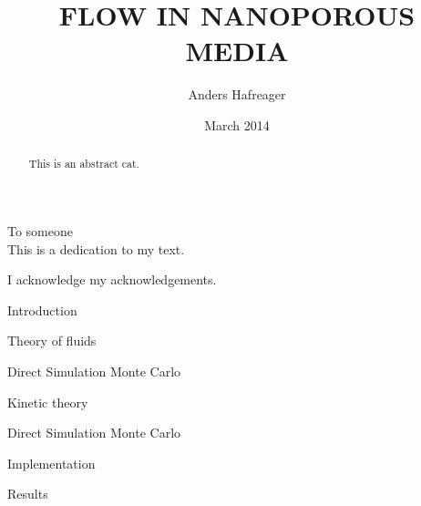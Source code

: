 \documentclass[twoside,english, a4paper, 12pt]{uiofysmaster}
\author{Anders Hafreager}
\title{\uppercase{Flow in nanoporous media}}
\date{March 2014}
\begin{document}
\maketitle
\clearpage

\begin{abstract}
This is an abstract cat.
\end{abstract}
\begin{dedication}
To someone
\\\vspace{12pt}
This is a dedication to my text.
\end{dedication}
\begin{acknowledgements}
  I acknowledge my acknowledgements.
\end{acknowledgements}

\tableofcontents
\clearpage
\listoffigures
\clearpage
\listoftables

\begin{chapter}{Introduction}
  
\end{chapter}

\begin{chapter}{Theory of fluids}
  \label{chap:theory_of_fluids}
  
  
  
\end{chapter}

\begin{part}{Direct Simulation Monte Carlo}
\begin{chapter}{Kinetic theory}
  \label{chap:kinetic_theory}
  
  
\end{chapter}

\begin{chapter}{Direct Simulation Monte Carlo}
  \label{chap:dsmc}
  
  
  
  
  
  
  
\end{chapter}
\begin{chapter}{Implementation}
\label{chap:dsmc_implementation}
  
  
  
  
\end{chapter}
\begin{chapter}{Results}
  \label{chap:dsmc_results}
  
  
\end{chapter}
\end{part}
\end{document}
